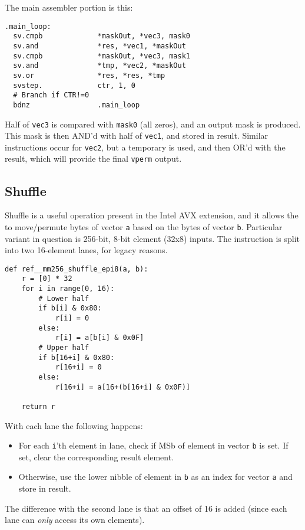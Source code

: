 The main assembler portion is this:
\begin{verbatim}
.main_loop:
  sv.cmpb             *maskOut, *vec3, mask0
  sv.and              *res, *vec1, *maskOut
  sv.cmpb             *maskOut, *vec3, mask1
  sv.and              *tmp, *vec2, *maskOut
  sv.or               *res, *res, *tmp
  svstep.             ctr, 1, 0
  # Branch if CTR!=0
  bdnz                .main_loop
\end{verbatim}

Half of \texttt{vec3} is compared with \texttt{mask0} (all zeros), and an output
mask is produced. This mask is then AND'd with half of \texttt{vec1}, and stored
in result.
Similar instructions occur for \texttt{vec2}, but a temporary is used, and then
OR'd with the result, which will provide the final \texttt{vperm} output.

\subsection{Shuffle}

Shuffle is a useful operation present in the Intel AVX extension, and it allows
the to move/permute bytes of vector \texttt{a} based on the bytes of vector
\texttt{b}.
Particular variant in question is 256-bit, 8-bit element (32x8) inputs.
The instruction is split into two 16-element lanes, for legacy reasons.

\begin{verbatim}
def ref__mm256_shuffle_epi8(a, b):
    r = [0] * 32
    for i in range(0, 16):
        # Lower half
        if b[i] & 0x80:
            r[i] = 0
        else:
            r[i] = a[b[i] & 0x0F]
        # Upper half
        if b[16+i] & 0x80:
            r[16+i] = 0
        else:
            r[16+i] = a[16+(b[16+i] & 0x0F)]

    return r
\end{verbatim}

With each lane the following happens:

\begin{itemize}
  \item For each \texttt{i}'th element in lane, check if \acrfull{MSb} of
        element in vector \texttt{b} is set. If set, clear the corresponding
        result element.
  \item Otherwise, use the lower nibble of element in \texttt{b} as an index
        for vector \texttt{a} and store in result.
\end{itemize}

The difference with the second lane is that an offset of 16 is added (since
each lane can \textit{only} access its own elements).

